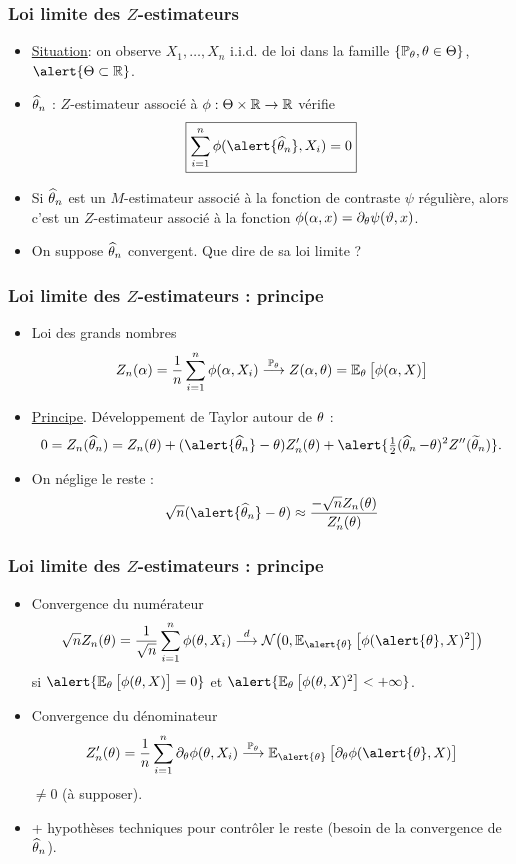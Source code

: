\begin{frame}
\frametitle{Loi limite des $Z$-estimateurs}
\begin{itemize}
\item \underline{Situation}: on observe $X_1,\ldots, X_n$ i.i.d. de loi dans la famille $\{\operatorname{{\mathbb P}}_\theta, \theta \in \Theta\}$, $\alert{\Theta \subset \R}$.
\item \alert{ $\operatorname{\widehat \theta_{\mathnormal{n}}}$} : $Z$-estimateur \alert{associé à} $\phi:\Theta \times \operatorname{{\mathbb R}} \rightarrow \operatorname{{\mathbb R}}$ vérifie
$$\boxed{\sum_{i = 1}^n \phi(\alert{\est},X_i)=0}$$
\item Si $\operatorname{\widehat \theta_{\mathnormal{n}}}$ est un $M$-estimateur associé à la fonction de contraste $\psi$ \alert{régulière}, alors c'est un $Z$-estimateur associé à la fonction $\phi(\alpha,x) = \partial_\theta\psi(\vartheta,x)$.
\item On suppose $\operatorname{\widehat \theta_{\mathnormal{n}}}$ convergent. \alert{ Que dire de sa loi limite} ?
\end{itemize}
\end{frame}

\begin{frame}
\frametitle{Loi limite des $Z$-estimateurs : principe}
\begin{itemize}
\item \alert{ Loi des grands nombres}$$Z_n(\alpha)=\frac{1}{n}\sum_{i = 1}^n \phi(\alpha,X_i) \stackrel{\operatorname{{\mathbb P}}_\theta}{\longrightarrow} Z(\alpha,\theta) = \operatorname{{\mathbb E}}_\theta\big[\phi(\alpha,X)\big]$$
\item \underline{Principe}. Développement de Taylor autour de $\theta$ :
$$0 = Z_n(\est) = Z_n(\truetheta)+(\alert{\est}-\truetheta)Z_n'(\truetheta)+\alert{\tfrac{1}{2}(\est-\truetheta)^2Z''(\widetilde \truetheta_n)}.$$
\item On \alert{ néglige} le reste :
$$\sqrt{n}(\alert{\est}-\truetheta) \approx \frac{-\sqrt{n}Z_n(\truetheta)}{Z_n'(\truetheta)}$$
\end{itemize}
\end{frame}

\begin{frame}
\frametitle{Loi limite des $Z$-estimateurs : principe}
\begin{itemize}
\item Convergence du \alert{ numérateur}
$$\sqrt{n}Z_n(\truetheta) = \frac{1}{\sqrt{n}}\sum_{i = 1}^n\phi(\truetheta,X_i) \stackrel{d}{\longrightarrow} {\mathcal N}\big(0,\E_ {\alert{\truetheta}}\big[\phi(\alert{\truetheta},X)^2\big]\big)$$
si $\alert{\E_\truetheta\big[\phi(\truetheta,X)\big]=0}$ et $\alert{\E_\truetheta\big[\phi(\truetheta,X)^2\big]<+\infty}$.
\item Convergence du \alert{ dénominateur} $$Z'_n(\truetheta) = \frac{1}{n}\sum_{i = 1}^n\partial_\truetheta \phi(\truetheta,X_i) \stackrel{\PP_\truetheta}{\longrightarrow}
\E_{\alert{\truetheta}}\big[\partial_\truetheta \phi(\alert{\truetheta},X)\big]$$
\alert{ $\neq 0$ (à supposer)}.
\item + hypothèses techniques pour \alert{ contrôler le reste} (besoin de la convergence de $\operatorname{\widehat \theta_{\mathnormal{n}}}$).
\end{itemize}
\end{frame}

